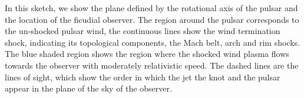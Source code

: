 In this sketch, we show the plane defined by the rotational axis of
the pulsar and the location of the ficudial observer. The region around the pulsar
corresponds to the un-shocked pulsar wind, the continuous lines show the wind
termination shock, indicating its topological components, the Mach belt, arch
and rim shocks. The blue shaded region shows the region where the shocked
wind plasma flows towards the observer with moderately relativistic speed. The
dashed lines are the lines of sight, which show the order in which the jet the
knot and the pulsar appear in the plane of the sky of the observer.